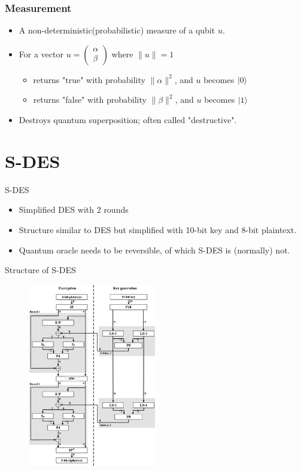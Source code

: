 \documentclass{beamer}
\begin{document}
	\begin{frame}
		\frametitle{Measurement}
		\begin{itemize}
			\item A non-deterministic(probabilistic) measure of a qubit $u$.
			\item For a vector $u=\begin{pmatrix} \alpha \\ \beta \end{pmatrix}$ where $\|u\|=1$
			\begin{itemize}
				\item returns "true" with probability $\|\alpha\|^2$, and $u$ becomes $\ket{0}$
				\item returns "false" with probability $\|\beta\|^2$, and $u$ becomes $\ket{1}$
			\end{itemize}
			\item Destroys quantum superposition; often called "destructive".
		\end{itemize}
	\end{frame}
	\fi
	
	\section{S-DES}
	
		\begin{frame}{S-DES}
		\begin{itemize}
			\item Simplified DES with 2 rounds
			\item Structure similar to DES but simplified with 10-bit key and 8-bit plaintext.
			\item Quantum oracle needs to be reversible, of which S-DES is (normally) not.
		\end{itemize}
	\end{frame}
	
	\begin{frame}{Structure of S-DES}
		\begin{figure}[h]
			\centering
			\includegraphics[width=0.5\textwidth]{./Images/sdes.png}
		\end{figure}
	\end{frame}
	
\end{document}
